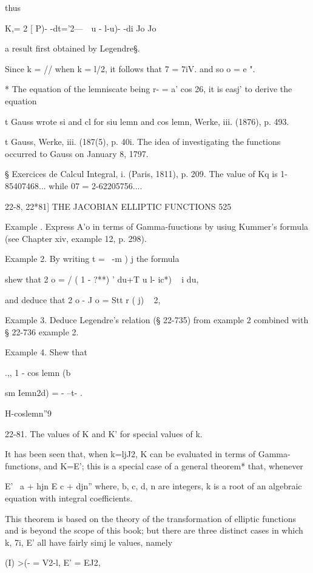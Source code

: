 thus

K,= 2 [ P)- -dt='2---\ \ u - l-u)- -di Jo Jo

a result first obtained by Legendre§.

Since k = // when k = l/\/2, it follows that 7 = 7iV. and so o = e ".

* The equation of the lemniscate being r- = a' cos 26, it is easj' to
derive the equation


t Gauss wrote si and cl for siu lemn and cos lemn, Werke, iii. (1876),
p. 493.

t Gauss, Werke, iii. (187(5), p. 40i. The idea of investigating the
functions occurred to Gauss on January 8, 1797.

§ Exercices de Calcul Integral, i. (Paris, 1811), p. 209. The value of
Kq is 1-85407468... while 07 = 2-62205756....

22-8, 22*81] THE JACOBIAN ELLIPTIC FUNCTIONS 525

Example . Express A'o in terms of Gamma-fuuctions by usiug Kummer's
formula (see Chapter xiv, example 12, p. 298).

Example 2. By writing t = \ -m ) j the formula

shew that 2 o = / ( 1 - ?**) ' du+T u l- ic*) ~ i du,

and deduce that 2 o - J o = Stt r ( j) ~ 2,

Example 3. Deduce Legendre's relation (§ 22-735) from example 2
combined with § 22-736 example 2.

Example 4. Shew that

.,, 1 - cos lemn (b

sm Iemn2d) = - --t- .

H-coslemn''9

22-81. The values of K and K' for special values of k.

It has been seen that, when k=ljJ2, K can be evaluated in terms of
Gamma-functions, and K=E'; this is a special case of a general
theorem* that, whenever

E' \ a + hjn E c + djn'' where, b, c, d, n are integers, k is a root
of an algebraic equation with integral coefficients.

This theorem is based on the theory of the transformation of elliptic
functions and is beyond the scope of this book; but there are three
distinct cases in which k, 7i, E' all have fairly simj le values,
namely

(I) >(- = V2-l, E' = EJ2,

